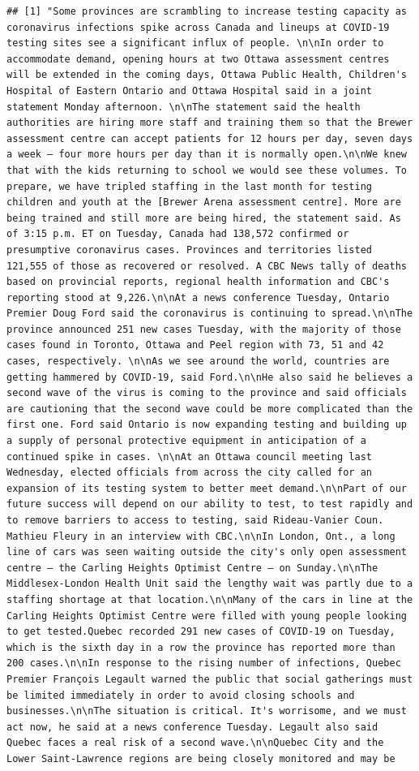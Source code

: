 \documentclass[]{article}
\begin{document}
\begin{verbatim}
## [1] "Some provinces are scrambling to increase testing capacity as coronavirus infections spike across Canada and lineups at COVID-19 testing sites see a significant influx of people. \n\nIn order to accommodate demand, opening hours at two Ottawa assessment centres will be extended in the coming days, Ottawa Public Health, Children's Hospital of Eastern Ontario and Ottawa Hospital said in a joint statement Monday afternoon. \n\nThe statement said the health authorities are hiring more staff and training them so that the Brewer assessment centre can accept patients for 12 hours per day, seven days a week — four more hours per day than it is normally open.\n\nWe knew that with the kids returning to school we would see these volumes. To prepare, we have tripled staffing in the last month for testing children and youth at the [Brewer Arena assessment centre]. More are being trained and still more are being hired, the statement said. As of 3:15 p.m. ET on Tuesday, Canada had 138,572 confirmed or presumptive coronavirus cases. Provinces and territories listed 121,555 of those as recovered or resolved. A CBC News tally of deaths based on provincial reports, regional health information and CBC's reporting stood at 9,226.\n\nAt a news conference Tuesday, Ontario Premier Doug Ford said the coronavirus is continuing to spread.\n\nThe province announced 251 new cases Tuesday, with the majority of those cases found in Toronto, Ottawa and Peel region with 73, 51 and 42 cases, respectively. \n\nAs we see around the world, countries are getting hammered by COVID-19, said Ford.\n\nHe also said he believes a second wave of the virus is coming to the province and said officials are cautioning that the second wave could be more complicated than the first one. Ford said Ontario is now expanding testing and building up a supply of personal protective equipment in anticipation of a continued spike in cases. \n\nAt an Ottawa council meeting last Wednesday, elected officials from across the city called for an expansion of its testing system to better meet demand.\n\nPart of our future success will depend on our ability to test, to test rapidly and to remove barriers to access to testing, said Rideau-Vanier Coun. Mathieu Fleury in an interview with CBC.\n\nIn London, Ont., a long line of cars was seen waiting outside the city's only open assessment centre — the Carling Heights Optimist Centre — on Sunday.\n\nThe Middlesex-London Health Unit said the lengthy wait was partly due to a staffing shortage at that location.\n\nMany of the cars in line at the Carling Heights Optimist Centre were filled with young people looking to get tested.Quebec recorded 291 new cases of COVID-19 on Tuesday, which is the sixth day in a row the province has reported more than 200 cases.\n\nIn response to the rising number of infections, Quebec Premier François Legault warned the public that social gatherings must be limited immediately in order to avoid closing schools and businesses.\n\nThe situation is critical. It's worrisome, and we must act now, he said at a news conference Tuesday. Legault also said Quebec faces a real risk of a second wave.\n\nQuebec City and the Lower Saint-Lawrence regions are being closely monitored and may be 
\end{verbatim}
\end{document}
